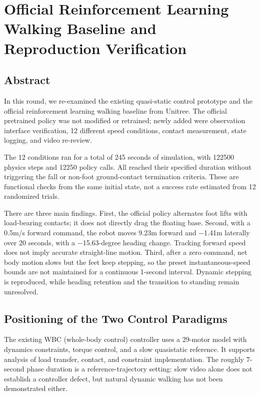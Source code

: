 \chapter{Official Reinforcement Learning Walking Baseline and Reproduction Verification}
\section{Abstract}\label{ux6458ux8981}

In this round, we re-examined the existing quasi-static control prototype and the official reinforcement learning walking baseline from Unitree. The official pretrained policy was not modified or retrained; newly added were observation interface verification, 12 different speed conditions, contact measurement, state logging, and video re-review.

The 12 conditions ran for a total of 245 seconds of simulation, with 122500 physics steps and 12250 policy calls. All reached their specified duration without triggering the fall or non-foot ground-contact termination criteria. These are functional checks from the same initial state, not a success rate estimated from 12 randomized trials.

There are three main findings. First, the official policy alternates foot lifts with load-bearing contacts; it does not directly drag the floating base. Second, with a 0.5m/s forward command, the robot moves 9.23m forward and −1.41m laterally over 20 seconds, with a −15.63-degree heading change. Tracking forward speed does not imply accurate straight-line motion. Third, after a zero command, net body motion slows but the feet keep stepping, so the preset instantaneous-speed bounds are not maintained for a continuous 1-second interval. Dynamic stepping is reproduced, while heading retention and the transition to standing remain unresolved.


\section{Positioning of the Two Control Paradigms}\label{ux4e24ux6761ux63a7ux5236ux8defux7ebfux7684ux5b9aux4f4d}

The existing WBC (whole-body control) controller uses a 29-motor model with dynamics constraints, torque control, and a slow quasistatic reference. It supports analysis of load transfer, contact, and constraint implementation. The roughly 7-second phase duration is a reference-trajectory setting: slow video alone does not establish a controller defect, but natural dynamic walking has not been demonstrated either.

